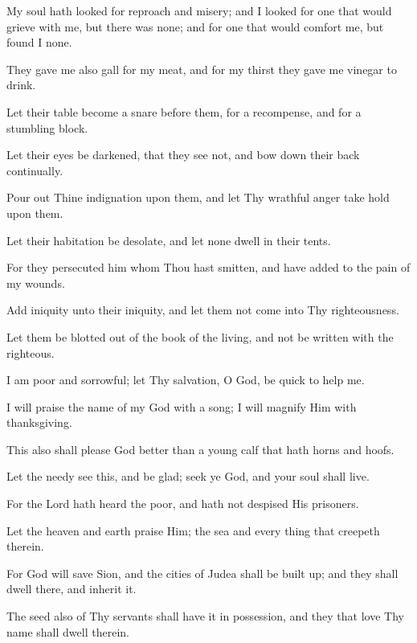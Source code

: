 My soul hath looked for reproach and misery; and I looked for one that would grieve with me, but there was none; and for one that would comfort me, but found I none.

They gave me also gall for my meat, and for my thirst they gave me vinegar to drink.

Let their table become a snare before them, for a recompense, and for a stumbling block.

Let their eyes be darkened, that they see not, and bow down their back continually.

Pour out Thine indignation upon them, and let Thy wrathful anger take hold upon them.

Let their habitation be desolate, and let none dwell in their tents.

For they persecuted him whom Thou hast smitten, and have added to the pain of my wounds.

Add iniquity unto their iniquity, and let them not come into Thy righteousness.

Let them be blotted out of the book of the living, and not be written with the righteous.

I am poor and sorrowful; let Thy salvation, O God, be quick to help me.

I will praise the name of my God with a song; I will magnify Him with thanksgiving.

This also shall please God better than a young calf that hath horns and hoofs.

Let the needy see this, and be glad; seek ye God, and your soul shall live.

For the Lord hath heard the poor, and hath not despised His prisoners.

Let the heaven and earth praise Him; the sea and every thing that creepeth therein.

For God will save Sion, and the cities of Judea shall be built up; and they shall dwell there, and inherit it.

The seed also of Thy servants shall have it in possession, and they that love Thy name shall dwell therein.
